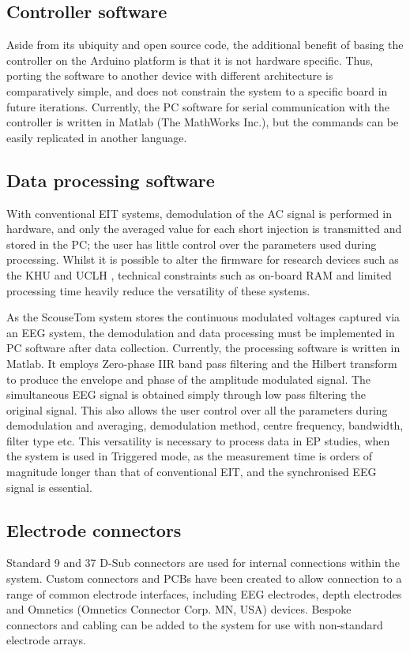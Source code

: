 
\subsection{Controller software}

Aside from its ubiquity and open source code, the additional benefit of basing the controller on the Arduino platform is that it is not hardware specific. Thus, porting the software to another device with different architecture is comparatively simple, and does not constrain the system to a specific board in future iterations. Currently, the PC software for serial communication with the controller is written in Matlab (The MathWorks Inc.), but the commands can be easily replicated in another language.

\subsection{Data processing software}

With conventional EIT systems, demodulation of the AC signal is performed in hardware, and only the averaged value for each short injection is transmitted and stored in the PC; the user has little control over the parameters used during processing. Whilst it is possible to alter the firmware for research devices such as the KHU \cite{Hun_Wi_2014} and UCLH \cite{McEwan_2006}, technical constraints such as on-board RAM and limited processing time heavily reduce the versatility of these systems. 

As the ScouseTom system stores the continuous modulated voltages captured via an EEG system, the demodulation and data processing must be implemented in PC software after data collection. Currently, the processing software is written in Matlab. It employs Zero-phase IIR band pass filtering and the Hilbert transform to produce the envelope and phase of the amplitude modulated signal. The simultaneous EEG signal is obtained simply through low pass filtering the original signal. This also allows the user control over all the parameters during demodulation and averaging, demodulation method, centre frequency, bandwidth, filter type etc. This versatility is necessary to process data in EP studies, when the system is used in Triggered mode, as the measurement time is orders of magnitude longer than that of conventional EIT, and the synchronised EEG signal is essential. 

\subsection{Electrode connectors}

Standard 9 and 37 D-Sub connectors are used for internal connections within the system. Custom connectors and PCBs have been created to allow connection to a range of common electrode interfaces, including EEG electrodes, depth electrodes and Omnetics (Omnetics Connector Corp. MN, USA) devices. Bespoke connectors and cabling can be added to the system for use with non-standard electrode arrays.